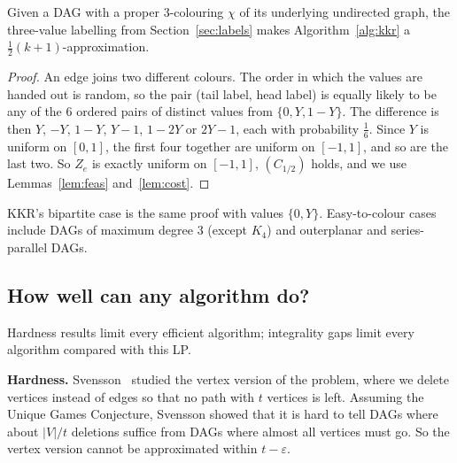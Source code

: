 \documentclass[sigconf,nonacm]{acmart}
\begin{document}
\begin{theorem}\label{thm:3col}
Given a DAG with a proper 3-colouring $\chi$ of its underlying undirected graph, the three-value labelling from Section~\ref{sec:labels} makes Algorithm~\ref{alg:kkr} a $\frac12(k+1)$-approximation.
\end{theorem}
\begin{proof}
An edge joins two different colours. The order in which the values are handed out is random, so the pair (tail label, head label) is equally likely to be any of the 6 ordered pairs of distinct values from $\{0,Y,1-Y\}$. The difference is then $Y$, $-Y$, $1-Y$, $Y-1$, $1-2Y$ or $2Y-1$, each with probability $\frac16$. Since $Y$ is uniform on $[0,1]$, the first four together are uniform on $[-1,1]$, and so are the last two. So $Z_e$ is exactly uniform on $[-1,1]$, $(C_{1/2})$ holds, and we use Lemmas~\ref{lem:feas} and~\ref{lem:cost}.
\end{proof}
KKR's bipartite case is the same proof with values $\{0,Y\}$. Easy-to-colour cases include DAGs of maximum degree 3 (except $K_4$) and outerplanar and series-parallel DAGs.

\subsection{How well can any algorithm do?}
Hardness results limit every efficient algorithm; integrality gaps limit every algorithm compared with this LP.

\textbf{Hardness.} Svensson~\cite{sv} studied the vertex version of the problem, where we delete vertices instead of edges so that no path with $t$ vertices is left. Assuming the Unique Games Conjecture, Svensson showed that it is hard to tell DAGs where about $|V|/t$ deletions suffice from DAGs where almost all vertices must go. So the vertex version cannot be approximated within $t-\varepsilon$.
\end{document}
